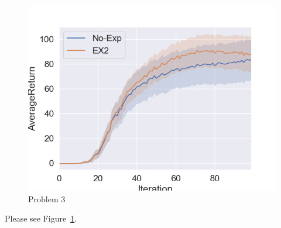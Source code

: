 \begin{figure}[htbp]
    \centering
    \includegraphics[width=0.5\linewidth]{figures/p3.png}
    \caption{Problem 3}
    \label{fig:p3}
\end{figure}

Please see Figure~\ref{fig:p3}. 